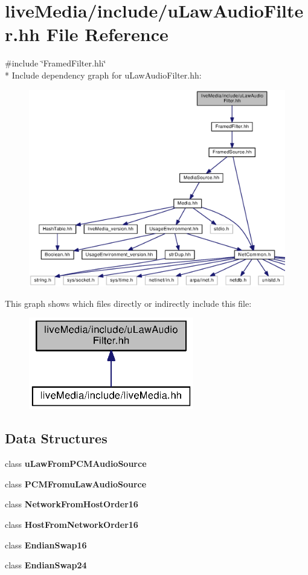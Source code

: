 \section{live\+Media/include/u\+Law\+Audio\+Filter.hh File Reference}
\label{uLawAudioFilter_8hh}
{\ttfamily \#include \char`\"{}Framed\+Filter.\+hh\char`\"{}}\\*
Include dependency graph for u\+Law\+Audio\+Filter.\+hh\+:
\nopagebreak
\begin{figure}[H]
\begin{center}
\leavevmode
\includegraphics[width=350pt]{uLawAudioFilter_8hh__incl}
\end{center}
\end{figure}
This graph shows which files directly or indirectly include this file\+:
\nopagebreak
\begin{figure}[H]
\begin{center}
\leavevmode
\includegraphics[width=204pt]{uLawAudioFilter_8hh__dep__incl}
\end{center}
\end{figure}
\subsection*{Data Structures}
\begin{DoxyCompactItemize}
\item 
class {\bf u\+Law\+From\+P\+C\+M\+Audio\+Source}
\item 
class {\bf P\+C\+M\+Fromu\+Law\+Audio\+Source}
\item 
class {\bf Network\+From\+Host\+Order16}
\item 
class {\bf Host\+From\+Network\+Order16}
\item 
class {\bf Endian\+Swap16}
\item 
class {\bf Endian\+Swap24}
\end{DoxyCompactItemize}
